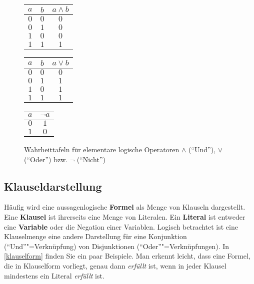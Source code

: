 \documentclass{sdqassignment}
\begin{document}
\begin{figure}[hb]
  \begin{minipage}{.3\linewidth}
    \centering
    \begin{tabular}{cc|c}
      $a$ & $b$ & $a \land b$ \\
      \hline
      $0$ & $0$ & $0$ \\
      $0$ & $1$ & $0$ \\
      $1$ & $0$ & $0$ \\
      $1$ & $1$ & $1$
    \end{tabular}
  \end{minipage}
  \hfill
  \begin{minipage}{.3\linewidth}
    \centering
    \begin{tabular}{cc|c}
      $a$ & $b$ & $a \lor b$ \\
      \hline
      $0$ & $0$ & $0$ \\
      $0$ & $1$ & $1$ \\
      $1$ & $0$ & $1$ \\
      $1$ & $1$ & $1$
    \end{tabular}
  \end{minipage}
  \hfill
  \begin{minipage}{.3\linewidth}
    \centering
    \begin{tabular}{c|c}
      $a$ & $\lnot a$ \\
      \hline
      $0$ & $1$ \\
      $1$ & $0$
    \end{tabular}
  \end{minipage}

  \caption{Wahrheittafeln für elementare logische Operatoren $\land$ (\enquote{Und}), $\lor$ (\enquote{Oder}) bzw. $\lnot$ (\enquote{Nicht})}
  \label{wahrheitstafel}
\end{figure}


\subsection{Klauseldarstellung}

Häufig wird eine aussagenlogische \textbf{Formel} als Menge von Klauseln dargestellt. Eine \textbf{Klausel} ist ihrerseits eine Menge von Literalen. Ein \textbf{Literal} ist entweder eine \textbf{Variable} oder die Negation einer Variablen. Logisch betrachtet ist eine Klauselmenge eine andere Darstellung für eine Konjunktion (\enquote{Und}"=Verknüpfung) von Disjunktionen (\enquote{Oder}"=Verknüpfungen). In \cref{klauselform} finden Sie ein paar Beispiele. Man erkennt leicht, dass eine Formel, die in Klauselform vorliegt, genau dann \textit{erfüllt} ist, wenn in jeder Klausel mindestens ein Literal \textit{erfüllt} ist.
\end{document}
